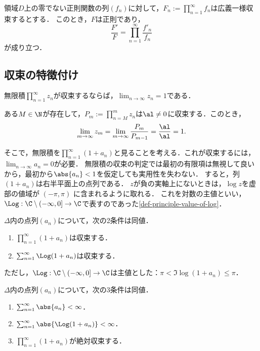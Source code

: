 \documentclass[uplatex, dvipdfmx]{jsreport}
\newcommand{\Logdomain}{\C\setminus(-\infty,0]}
\begin{document}
\begin{lemma}[対数微分]
    領域$D$上の零でない正則関数の列$(f_n)$に対して，$F_n:=\prod^\infty_{n=1}f_n$は広義一様収束するとする．
    このとき，$F$は正則であり，
    \[\frac{F'}{F}=\prod^\infty_{n=1}\frac{f'_n}{f_n}\]
    が成り立つ．
\end{lemma}

\subsection{収束の特徴付け}

\begin{lemma}[無限積の収束に必要な自明な必要条件]
    無限積$\prod_{n=1}^\infty z_n$が収束するならば，$\lim_{n\to\infty}z_n=1$である．
\end{lemma}
\begin{Proof}
    ある$M\in\N$が存在して，$P_m:=\prod^m_{n=M}z_n$は$\al\ne0$に収束する．このとき，
    \[\lim_{m\to\infty}z_m=\lim_{m\to\infty}\frac{P_m}{P_{m-1}}=\frac{\al}{\al}=1.\]
\end{Proof}

\begin{remark}
    そこで，無限積を$\prod^\infty_{n=1}(1+a_n)$と見ることを考える．これが収束するには，$\lim_{n\to\infty}a_n=0$が必要．
    無限積の収束の判定では最初の有限項は無視して良いから，最初から$\abs{a_n}<1$を仮定しても実用性を失わない．
    すると，列$(1+a_n)$は右半平面上の点列である．
    $z$が負の実軸上にないときは，$\log z$を虚部の値域が
    $(-\pi,\pi)$
    に含まれるように取れる．
    これを対数の主値といい，$\Log:\Logdomain\to\C$で表すのであった\ref{def-principle-value-of-log}．
\end{remark}

\begin{theorem}[無限積が収束することの特徴付け]
    $\Delta$内の点列$(a_n)$について，次の2条件は同値．
    \begin{enumerate}
        \item $\prod^\infty_{n=1}(1+a_n)$は収束する．
        \item $\sum^\infty_{n=1}\Log(1+a_n)$は収束する．
    \end{enumerate}
    ただし，$\Log:\Logdomain\to\C$は主値とした：$\pi<\Im\log(1+a_n)\le\pi$．
\end{theorem}

\begin{proposition}
    $\Delta$内の点列$(a_n)$について，次の3条件は同値．
    \begin{enumerate}
        \item $\sum^\infty_{n=1}\abs{a_n}<\infty$．
        \item $\sum^\infty_{n=1}\abs{\Log(1+a_n)}<\infty$．
        \item $\prod_{n=1}^\infty(1+a_n)$が絶対収束する．
    \end{enumerate}
\end{proposition}
\end{document}
